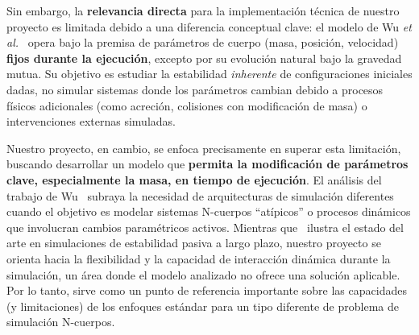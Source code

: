 Sin embargo, la \textbf{relevancia directa} para la implementación técnica de nuestro proyecto es limitada debido a una diferencia conceptual clave: el modelo de Wu \textit{et al.}~\cite{Wu2025} opera bajo la premisa de parámetros de cuerpo (masa, posición, velocidad) \textbf{fijos durante la ejecución}, excepto por su evolución natural bajo la gravedad mutua. Su objetivo es estudiar la estabilidad \textit{inherente} de configuraciones iniciales dadas, no simular sistemas donde los parámetros cambian debido a procesos físicos adicionales (como acreción, colisiones con modificación de masa) o intervenciones externas simuladas.

Nuestro proyecto, en cambio, se enfoca precisamente en superar esta limitación, buscando desarrollar un modelo que \textbf{permita la modificación de parámetros clave, especialmente la masa, en tiempo de ejecución}. El análisis del trabajo de Wu~\cite{Wu2025} subraya la necesidad de arquitecturas de simulación diferentes cuando el objetivo es modelar sistemas N-cuerpos ``atípicos'' o procesos dinámicos que involucran cambios paramétricos activos. Mientras que~\cite{Wu2025} ilustra el estado del arte en simulaciones de estabilidad pasiva a largo plazo, nuestro proyecto se orienta hacia la flexibilidad y la capacidad de interacción dinámica durante la simulación, un área donde el modelo analizado no ofrece una solución aplicable. Por lo tanto, sirve como un punto de referencia importante sobre las capacidades (y limitaciones) de los enfoques estándar para un tipo diferente de problema de simulación N-cuerpos.
